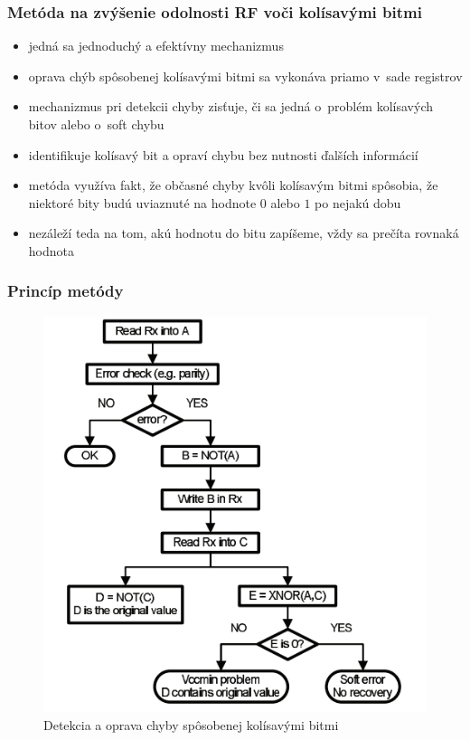 \documentclass{beamer}
\begin{document}
\begin{frame}\frametitle{Metóda na zvýšenie odolnosti RF voči kolísavými bitmi}
\begin{itemize}
	\item jedná sa jednoduchý a efektívny mechanizmus
	\item oprava chýb spôsobenej kolísavými bitmi sa vykonáva priamo v~sade registrov
	\item mechanizmus pri detekcii chyby zisťuje, či sa jedná o~problém kolísavých bitov alebo o~soft chybu
	\item identifikuje kolísavý bit a opraví chybu bez nutnosti ďalších informácií
	\item metóda využíva fakt, že občasné chyby kvôli kolísavým bitmi spôsobia, že niektoré bity budú uviaznuté na hodnote $0$ alebo $1$ po nejakú dobu
	\item nezáleží teda na tom, akú hodnotu do bitu zapíšeme, vždy sa prečíta rovnaká hodnota
\end{itemize}
\end{frame}

\begin{frame}\frametitle{Princíp metódy}
\begin{center}
\begin{figure}
\includegraphics[width=\textwidth,height=0.7\textheight,keepaspectratio]{method.png}
\caption{Detekcia a oprava chyby spôsobenej kolísavými bitmi}
\end{figure}
\end{center}
\end{frame}
\end{document}
